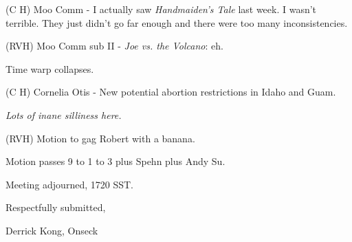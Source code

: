 (C H) Moo Comm - I actually saw {\em Handmaiden's Tale} last week.  I
wasn't terrible.  They just didn't go far enough and there were too
many inconsistencies.

(RVH) Moo Comm sub II - {\em Joe vs. the Volcano}: eh.

Time warp collapses.

(C H) Cornelia Otis - New potential abortion restrictions in Idaho and
Guam.

{\em Lots of inane silliness here.}

(RVH) Motion to gag Robert with a banana.

Motion passes 9 to 1 to 3 plus Spehn plus Andy Su.

Meeting adjourned, 1720 SST.

\vspace{0.15in}
\begin{center}
Respectfully submitted,

Derrick Kong, Onseck
\end{center}

